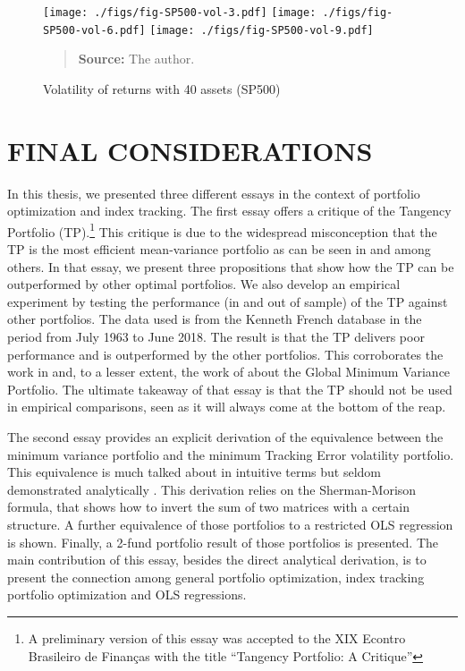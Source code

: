 \documentclass[12pt,oneside,a4paper]{memoir}
\begin{document}
\begin{figure}[htpb]
\centering
\footnotesize
\caption{Volatility of returns with 40 assets (SP500)}
\label{fig:sp500:vol:40a}
\texttt{[image: ./figs/fig-SP500-vol-3.pdf]}
\texttt{[image: ./figs/fig-SP500-vol-6.pdf]}
\texttt{[image: ./figs/fig-SP500-vol-9.pdf]}
\begin{quote}
\textbf{Source:} The author.
\end{quote}
\end{figure}


\chapter{FINAL CONSIDERATIONS}

In this thesis, we presented three different essays in the context of portfolio optimization and index tracking.
The first essay offers a critique of the Tangency Portfolio (TP).\footnote{A preliminary version of this essay was accepted to the XIX Econtro Brasileiro de Finanças with the title ``Tangency Portfolio: A Critique''}
This critique is due to the widespread misconception that the TP is the most efficient mean-variance portfolio as can be seen in  and  among others.
In that essay, we present three propositions that show how the TP can be outperformed by other optimal portfolios.
We also develop an empirical experiment by testing the performance (in and out of sample) of the TP against other portfolios.
The data used is from the Kenneth French database in the period from July 1963 to June 2018.
The result is that the TP delivers poor performance and is outperformed by the other portfolios.
This corroborates the work in  and, to a lesser extent, the work of  about the Global Minimum Variance Portfolio.
The ultimate takeaway of that essay is that the TP should not be used in empirical comparisons, seen as it will always come at the bottom of the reap.

The second essay provides an explicit derivation of the equivalence between the minimum variance portfolio and the minimum Tracking Error volatility portfolio.
This equivalence is much talked about in intuitive terms but seldom demonstrated analytically \cite{liu-2009, demol2016}.
This derivation relies on the Sherman-Morison formula, that shows how to invert the sum of two matrices with a certain structure.
A further equivalence of those portfolios to a restricted OLS regression is shown.
Finally, a 2-fund portfolio result of those portfolios is presented.
The main contribution of this essay, besides the direct analytical derivation, is to present the connection among general portfolio optimization, index tracking portfolio optimization and OLS regressions.
\end{document}
